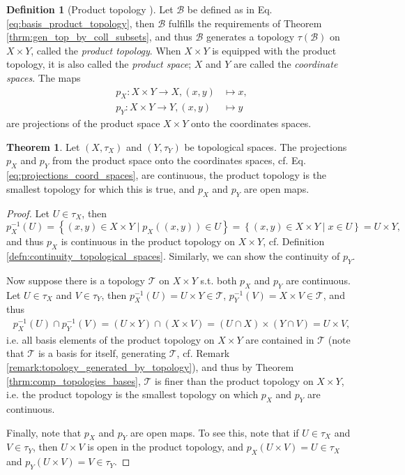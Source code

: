 \documentclass[12pt, a4paper]{article}
\numberwithin{equation}{section}
\theoremstyle{definition}
\theoremstyle{definition}
\newtheorem{defn}[thm]{Definition} %
\newtheorem{theorem}[thm]{Theorem}
\begin{document}
		\begin{defn}[Product topology \cite{topology-singh}]\label{defn:product_topology}
			Let $\mathscr B$ be defined as in Eq. \ref{eq:basis_product_topology}, then $\mathscr B$ fulfills the requirements of Theorem \ref{thrm:gen_top_by_coll_subsets}, and thus $\mathscr B$ generates a topology $\tau(\mathscr B)$ on $X\times Y$, called the \textit{product topology}. When $X \times Y$ is equipped with the product topology, it is also called the \textit{product space}; $X$ and $Y$ are called the \textit{coordinate spaces}. The maps
			\begin{equation}
				\begin{aligned}
					p_X: X\times Y\to X, (x, y) &\mapsto x, \label{eq:projections_coord_spaces} 
					\\ p_Y: X\times Y\to Y, (x, y)&\mapsto y
				\end{aligned}
			\end{equation}
			are projections of the product space $X\times Y$ onto the coordinates spaces.
		\end{defn}
	
		\begin{theorem}
			Let $(X, \tau_X)$ and $(Y, \tau_Y)$ be topological spaces. The projections $p_X$ and $p_Y$ from the product space onto the coordinates spaces, cf. Eq. \eqref{eq:projections_coord_spaces}, are continuous, the product topology is the smallest topology for which this is true, and $p_X$ and $p_Y$ are open maps.
		\end{theorem}
	
		\begin{proof}
			Let $U\in \tau_X$, then $$p_X^{-1}(U) = \left\{(x, y)\in X\times Y \mid p_X((x, y))\in U\right\} = \left\{(x, y)\in X\times Y \mid x\in U\right\} = U\times Y,$$ and thus $p_X$ is continuous in the product topology on $X\times Y$, cf. Definition \ref{defn:continuity_topological_spaces}. Similarly, we can show the continuity of $p_Y$.
			
			Now suppose there is a topology $\mathscr T$ on $X\times Y$ s.t. both $p_X$ and $p_Y$ are continuous. Let $U\in \tau_X$ and $V\in\tau_Y$, then $p_X^{-1}(U) = U\times Y\in \mathscr T$, $p_Y^{-1}(V) = X\times V\in \mathscr T$, and thus
			\begin{align}\label{eq:intersection_of_preimage_of_projs}
				p_X^{-1}(U) \cap p_Y^{-1}(V) = (U\times Y)\cap (X\times V) = (U\cap X) \times (Y\cap V) = U\times V,
			\end{align}
			i.e. all basis elements of the product topology on $X\times Y$ are contained in $\mathscr T$ (note that $\mathscr T$ is a basis for itself, generating $\mathscr T$, cf. Remark \ref{remark:topology_generated_by_topology}), and thus by Theorem \ref{thrm:comp_topologies_bases}, $\mathscr T$ is finer than the product topology on $X\times Y$, i.e. the product topology is the smallest topology on which $p_X$ and $p_Y$ are continuous.
			
			Finally, note that $p_X$ and $p_Y$ are open maps. To see this, note that if $U\in\tau_X$ and $V\in\tau_Y$, then $U\times V$ is open in the product topology, and $p_X(U\times V) = U\in\tau_X$ and $p_Y(U\times V) = V\in\tau_Y$.
		\end{proof}
		
\end{document}

